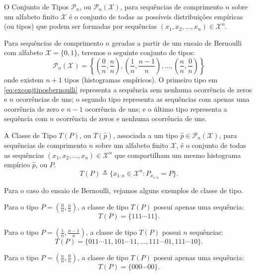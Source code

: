 \begin{definition}
    O Conjunto de Tipos $\mathcal{P}_n$, ou $\mathcal{P}_n (\mathcal{X})$, para sequências de comprimento $n$ sobre um alfabeto finito $\mathcal{X}$ 
    é o conjunto de todas as possíveis distribuições empíricas (ou tipos) que podem ser formadas 
    por sequências $(x_1, x_2, \ldots, x_n) \in \mathcal{X}^n$.
\end{definition}
\begin{example}
Para sequências de comprimento $n$ geradas a partir de um ensaio de Bernoulli com alfabeto $\mathcal{X} = \{0,1\}$,
teremos o seguinte conjunto de tipos:
\begin{equation}\label{eq:exconjtiposbernoulli}
\mathcal{P}_n (\mathcal{X}) = \left\{ \left( \frac{0}{n}, \frac{n}{n} \right), \left( \frac{1}{n} , \frac{n-1}{n} \right), \ldots, \left( \frac{n}{n}, \frac{0}{n} \right)\right\}
\end{equation}
onde existem $n+1$ tipos (histogramas empíricos). O primeiro tipo em \ref{eq:exconjtiposbernoulli} representa
a sequência sem nenhuma ocorrência de zeros e $n$ ocorrências de uns; o segundo tipo representa 
as sequências com apenas uma ocorrência de zero e $n-1$ ocorrência de uns; e o último tipo
representa a sequência com $n$ ocorrência de zeros e nenhuma ocorrência de uns.
\end{example}


\begin{definition}
    A Classe de Tipo $T(P)$, ou $T(\hat{p})$, associada a um tipo $\hat{p} \in \mathcal{P}_n(\mathcal{X})$, 
    para sequências de comprimento $n$ sobre um alfabeto finito $\mathcal{X}$, 
    é o conjunto de todas as sequências $(x_1, x_2, \ldots, x_n) \in \mathcal{X}^n$ 
    que compartilham um mesmo histograma empírico $\hat{p}$, ou $P$.
    \begin{equation}
      T(P) \triangleq \{ x_{1:n} \in \mathcal{X}^n : P_{x_{1:n}} = P \} .
    \end{equation}
\end{definition}
\begin{example}
Para o caso do ensaio de Bernoulli, vejamos alguns exemplos de classe de tipo.

Para o tipo $P = \left( \frac{0}{n}, \frac{n}{n} \right)$, a classe de tipo $T(P)$ 
possui apenas uma sequência:
\begin{equation}
    T(P) = \{ 111\cdots{}11 \} .
\end{equation}

Para o tipo $P = \left( \frac{1}{n} , \frac{n-1}{n} \right)$, a classe de tipo $T(P)$
possui $n$ sequências:
\begin{equation}
    T(P) = \{ 011\cdots{}11, 101\cdots{}11, \ldots, 111\cdots{}01, 111\cdots{}10 \} .
\end{equation}

Para o tipo $P = \left( \frac{n}{n}, \frac{0}{n} \right)$, a classe de tipo $T(P)$
possui apenas uma sequência:
\begin{equation}
    T(P) = \{ 000\cdots{}00 \} .
\end{equation}
\end{example}


